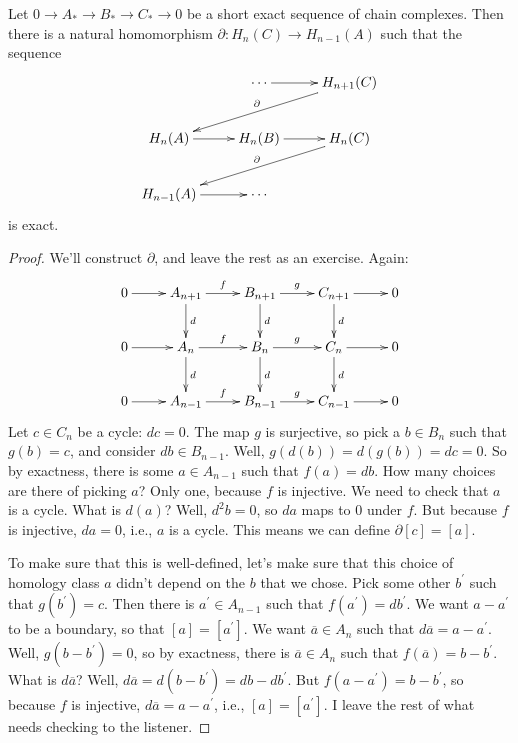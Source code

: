 \begin{theorem}
Let $0\to A_\ast\to B_\ast\to C_\ast\to 0$ be a short exact sequence of chain complexes. Then there is a natural homomorphism $\partial: H_n(C)\to H_{n-1}(A)$ such that the sequence 
\begin{equation*}
\xymatrix{ & \cdots \ar[r] & H_{n+1}(C) \ar[dll]_\partial \\
 H_n(A)\ar[r] & H_n(B)\ar[r] & H_n(C)\ar[dll]_\partial\\
 H_{n-1}(A)\ar[r] & \cdots & }
\end{equation*}
is exact.
\end{theorem}
\begin{proof}
We'll construct $\partial$, and leave the rest as an exercise. Again:
\begin{equation*}
\xymatrix{0\ar[r] & A_{n+1}\ar[r]^f\ar[d]^d & B_{n+1}\ar[r]^g\ar[d]^d & C_{n+1}\ar[r]\ar[d]^d & 0\\
0\ar[r] & A_n\ar[r]^f\ar[d]^d & B_n\ar[r]^g\ar[d]^d & C_n\ar[r]\ar[d]^d & 0\\
0\ar[r] & A_{n-1}\ar[r]^f & B_{n-1}\ar[r]^g & C_{n-1}\ar[r] & 0}
\end{equation*}
Let $c\in C_n$ be a cycle: $dc=0$. The map $g$ is surjective, so pick a $b\in B_n$ such that $g(b)=c$, and consider $db\in B_{n-1}$. Well, $g(d(b))=d(g(b))=dc=0$. So by exactness, there is some $a\in A_{n-1}$ such that $f(a)=db$. How many choices are there of picking $a$? Only one, because $f$ is injective. We need to check that $a$ is a cycle. What is $d(a)$? Well, $d^2b=0$, so $da$ maps to $0$ under $f$. But because $f$ is injective, $da=0$, i.e., $a$ is a cycle. This means we can define $\partial[c]=[a]$.

To make sure that this is well-defined, let's make sure that this choice of homology class $a$ didn't depend on the $b$ that we chose. Pick some other $b^\prime$ such that $g(b^\prime)=c$. Then there is $a^\prime\in A_{n-1}$ such that $f(a^\prime)=db^\prime$. We want $a-a^\prime$ to be a boundary, so that $[a]=[a^\prime]$. We want $\overline{a}\in A_n$ such that $d\overline{a}=a-a^\prime$. Well, $g(b-b^\prime)=0$, so by exactness, there is $\overline{a}\in A_n$ such that $f(\overline{a})=b-b^\prime$. What is $d\overline{a}$? Well, $d\overline{a}=d(b-b^\prime)=db-db^\prime$. But $f(a-a^\prime)=b-b^\prime$, so because $f$ is injective, $d\overline{a}=a-a^\prime$, i.e., $[a]=[a^\prime]$. 
I leave the rest of what needs checking to the listener. 
\end{proof}

